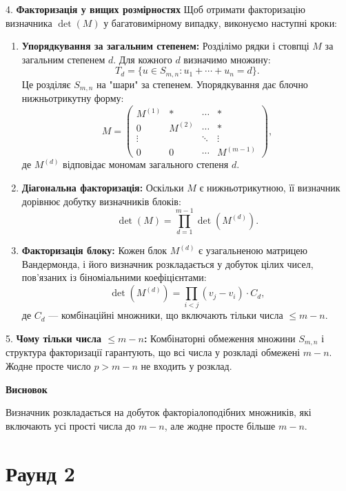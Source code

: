 \documentclass{article}
\begin{document}
4. \textbf{Факторизація у вищих розмірностях}  
   Щоб отримати факторизацію визначника \(\det(M)\) у багатовимірному випадку, виконуємо наступні кроки:
   \begin{enumerate}
       \item \textbf{Упорядкування за загальним степенем:}  
       Розділімо рядки і стовпці \( M \) за загальним степенем \( d \). Для кожного \( d \) визначимо множину:
       \[
       T_d = \{ u \in S_{m,n} : u_1+\cdots+u_n = d \}.
       \]
       Це розділяє \( S_{m,n} \) на "шари" за степенем. Упорядкування дає блочно нижньотрикутну форму:
       \[
       M = \begin{pmatrix}
       M^{(1)} & * & \cdots & * \\
       0 & M^{(2)} & \cdots & * \\
       \vdots & & \ddots & \vdots \\
       0 & 0 & \cdots & M^{(m-1)}
       \end{pmatrix},
       \]
       де \( M^{(d)} \) відповідає мономам загального степеня \( d \).

       \item \textbf{Діагональна факторизація:}  
       Оскільки \( M \) є нижньотрикутною, її визначник дорівнює добутку визначників блоків:
       \[
       \det(M) = \prod_{d=1}^{m-1} \det(M^{(d)}).
       \]

       \item \textbf{Факторизація блоку:}  
       Кожен блок \( M^{(d)} \) є узагальненою матрицею Вандермонда, і його визначник розкладається у добуток цілих чисел, пов’язаних із біноміальними коефіцієнтами:
       \[
       \det(M^{(d)}) = \prod_{i < j} (v_j - v_i) \cdot C_d,
       \]
       де \( C_d \) — комбінаційні множники, що включають тільки числа \( \leq m-n \).
   \end{enumerate}

5. \textbf{Чому тільки числа \( \leq m-n \):}  
   Комбінаторні обмеження множини \( S_{m,n} \) і структура факторизації гарантують, що всі числа у розкладі обмежені \( m-n \). Жодне просте число \( p > m-n \) не входить у розклад.

\bigskip

\textbf{Висновок}

Визначник розкладається на добуток факторіалоподібних множників, які включають усі прості числа до \( m-n \), але жодне просте більше \( m-n \).

\section*{\centering \textbf{Раунд 2}}
\end{document}
